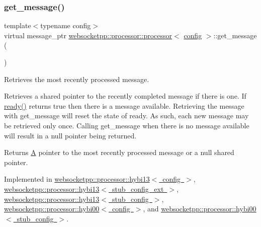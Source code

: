 \subsubsection{\texorpdfstring{get\+\_\+message()}{get\_message()}}
{\footnotesize\ttfamily template$<$typename config$>$ \\
virtual message\+\_\+ptr \mbox{\hyperlink{classwebsocketpp_1_1processor_1_1processor}{websocketpp\+::processor\+::processor}}$<$ \mbox{\hyperlink{classconfig}{config}} $>$\+::get\+\_\+message (\begin{DoxyParamCaption}{ }\end{DoxyParamCaption})\hspace{0.3cm}{\ttfamily [pure virtual]}}



Retrieves the most recently processed message. 

Retrieves a shared pointer to the recently completed message if there is one. If \mbox{\hyperlink{classwebsocketpp_1_1processor_1_1processor_a623344489598696c98cecebb03c18333}{ready()}} returns true then there is a message available. Retrieving the message with get\+\_\+message will reset the state of ready. As such, each new message may be retrieved only once. Calling get\+\_\+message when there is no message available will result in a null pointer being returned.

\begin{DoxyReturn}{Returns}
\mbox{\hyperlink{struct_a}{A}} pointer to the most recently processed message or a null shared pointer. 
\end{DoxyReturn}


Implemented in \mbox{\hyperlink{classwebsocketpp_1_1processor_1_1hybi13_a8fe09bba8cbe2821ef5c7cf3fd9573cd}{websocketpp\+::processor\+::hybi13$<$ config $>$}}, \mbox{\hyperlink{classwebsocketpp_1_1processor_1_1hybi13_a8fe09bba8cbe2821ef5c7cf3fd9573cd}{websocketpp\+::processor\+::hybi13$<$ stub\+\_\+config\+\_\+ext $>$}}, \mbox{\hyperlink{classwebsocketpp_1_1processor_1_1hybi13_a8fe09bba8cbe2821ef5c7cf3fd9573cd}{websocketpp\+::processor\+::hybi13$<$ stub\+\_\+config $>$}}, \mbox{\hyperlink{classwebsocketpp_1_1processor_1_1hybi00_af5f3b4bec38c586e31c0574b6c3f56b8}{websocketpp\+::processor\+::hybi00$<$ config $>$}}, and \mbox{\hyperlink{classwebsocketpp_1_1processor_1_1hybi00_af5f3b4bec38c586e31c0574b6c3f56b8}{websocketpp\+::processor\+::hybi00$<$ stub\+\_\+config $>$}}.

\mbox{\label{classwebsocketpp_1_1processor_1_1processor_aadfe0d42b76757aba603d9cc06c9ffd1}} 
